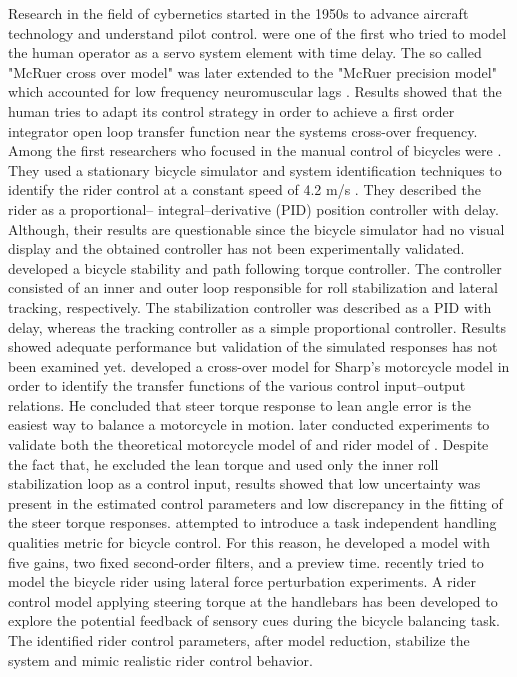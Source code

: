Research in the field of cybernetics started in the 1950s to advance aircraft technology and understand pilot control. \citet{mcruer1959human} were one of the first who tried to model the human operator as a servo system element with  time delay. The so called "McRuer cross over model" was later extended to the "McRuer precision model" which accounted for low frequency neuromuscular lags \cite{mcruer1967manual}.  Results showed that the human tries to adapt its control strategy in order to achieve a first order integrator open loop transfer function  near the systems cross-over frequency. Among the first researchers who focused in the manual control of bicycles were \citet{van1970influence}. They used a stationary bicycle simulator and system identification techniques to identify the rider control at a constant speed of 4.2 m/s . They described the rider as a proportional– integral–derivative (PID) position controller with delay. Although, their results are questionable since the bicycle simulator had no visual display and the obtained controller has not been experimentally validated. \citet{roland1971massing, roland1973computer} developed a bicycle stability and path following torque controller. The controller consisted of an inner and outer loop responsible for roll stabilization and lateral tracking, respectively. The stabilization controller was described as a PID with delay, whereas the tracking controller as a simple proportional controller. Results showed adequate performance but validation of the simulated responses has not been examined yet. \citet{weir1973manual} developed a cross-over model for Sharp's  \cite{sharp1971stability} motorcycle model in order to identify the transfer functions of the various control input–output relations. He concluded that steer torque response to lean angle error is the easiest way to balance a motorcycle in motion. \citet{eaton1975man} later conducted experiments to validate both the theoretical motorcycle model of  \citet{sharp1971stability} and rider model of \citet{weir1973manual} . Despite the fact that, he excluded the lean torque and used only the inner roll stabilization loop as a control input, results showed that low uncertainty was present in the estimated control parameters and low discrepancy in the fitting of the steer torque responses. \citet{hess2012modeling} attempted to introduce a task independent handling qualities metric for bicycle control. For this reason, he developed a model with five gains, two fixed second-order filters, and a preview time. \citet{schwab2013} recently tried to model the bicycle rider using lateral force perturbation experiments. A rider control model applying steering torque at the handlebars has been developed to explore the potential feedback of sensory cues during the bicycle balancing task. The identified rider control parameters, after model reduction, stabilize the system and mimic realistic rider control behavior.


